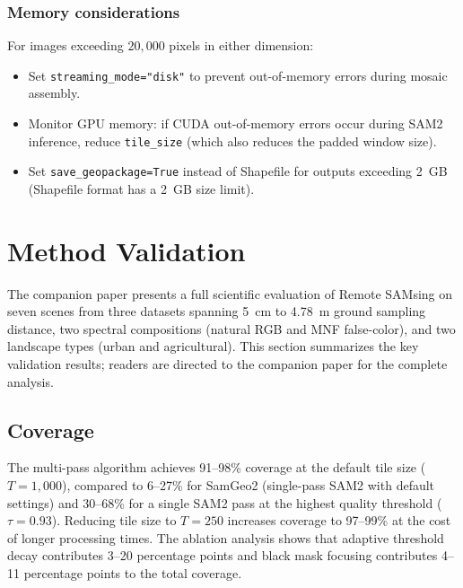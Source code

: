 \documentclass[review,11pt,authoryear]{elsarticle}
\begin{document}
\subsubsection{Memory considerations}

For images exceeding $20{,}000$ pixels in either dimension:
\begin{itemize}
    \item Set \texttt{streaming\_mode="disk"} to prevent out-of-memory errors during mosaic assembly.
    \item Monitor GPU memory: if CUDA out-of-memory errors occur during SAM2 inference, reduce \texttt{tile\_size} (which also reduces the padded window size).
    \item Set \texttt{save\_geopackage=True} instead of Shapefile for outputs exceeding 2~GB (Shapefile format has a 2~GB size limit).
\end{itemize}


\section{Method Validation}
\label{sec:validation}

The companion paper \citep{carvalho2026jag} presents a full scientific evaluation of Remote SAMsing on seven scenes from three datasets spanning 5~cm to 4.78~m ground sampling distance, two spectral compositions (natural RGB and MNF false-color), and two landscape types (urban and agricultural). This section summarizes the key validation results; readers are directed to the companion paper for the complete analysis.

\subsection{Coverage}

The multi-pass algorithm achieves 91--98\% coverage at the default tile size ($T = 1{,}000$), compared to 6--27\% for SamGeo2 \citep{wu2023samgeo} (single-pass SAM2 with default settings) and 30--68\% for a single SAM2 pass at the highest quality threshold ($\tau = 0.93$). Reducing tile size to $T = 250$ increases coverage to 97--99\% at the cost of longer processing times. The ablation analysis shows that adaptive threshold decay contributes 3--20 percentage points and black mask focusing contributes 4--11 percentage points to the total coverage.
\end{document}
